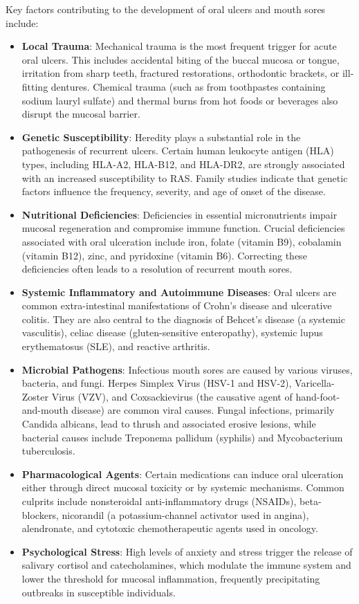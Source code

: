 Key factors contributing to the development of oral ulcers and mouth sores include:
\begin{itemize}
    \item \textbf{Local Trauma}: Mechanical trauma is the most frequent trigger for acute oral ulcers. This includes accidental biting of the buccal mucosa or tongue, irritation from sharp teeth, fractured restorations, orthodontic brackets, or ill-fitting dentures. Chemical trauma (such as from toothpastes containing sodium lauryl sulfate) and thermal burns from hot foods or beverages also disrupt the mucosal barrier.
    \item \textbf{Genetic Susceptibility}: Heredity plays a substantial role in the pathogenesis of recurrent ulcers. Certain human leukocyte antigen (HLA) types, including HLA-A2, HLA-B12, and HLA-DR2, are strongly associated with an increased susceptibility to RAS. Family studies indicate that genetic factors influence the frequency, severity, and age of onset of the disease.
    \item \textbf{Nutritional Deficiencies}: Deficiencies in essential micronutrients impair mucosal regeneration and compromise immune function. Crucial deficiencies associated with oral ulceration include iron, folate (vitamin B9), cobalamin (vitamin B12), zinc, and pyridoxine (vitamin B6). Correcting these deficiencies often leads to a resolution of recurrent mouth sores.
    \item \textbf{Systemic Inflammatory and Autoimmune Diseases}: Oral ulcers are common extra-intestinal manifestations of Crohn's disease and ulcerative colitis. They are also central to the diagnosis of Behcet's disease (a systemic vasculitis), celiac disease (gluten-sensitive enteropathy), systemic lupus erythematosus (SLE), and reactive arthritis.
    \item \textbf{Microbial Pathogens}: Infectious mouth sores are caused by various viruses, bacteria, and fungi. Herpes Simplex Virus (HSV-1 and HSV-2), Varicella-Zoster Virus (VZV), and Coxsackievirus (the causative agent of hand-foot-and-mouth disease) are common viral causes. Fungal infections, primarily Candida albicans, lead to thrush and associated erosive lesions, while bacterial causes include Treponema pallidum (syphilis) and Mycobacterium tuberculosis.
    \item \textbf{Pharmacological Agents}: Certain medications can induce oral ulceration either through direct mucosal toxicity or by systemic mechanisms. Common culprits include nonsteroidal anti-inflammatory drugs (NSAIDs), beta-blockers, nicorandil (a potassium-channel activator used in angina), alendronate, and cytotoxic chemotherapeutic agents used in oncology.
    \item \textbf{Psychological Stress}: High levels of anxiety and stress trigger the release of salivary cortisol and catecholamines, which modulate the immune system and lower the threshold for mucosal inflammation, frequently precipitating outbreaks in susceptible individuals.
\end{itemize}

